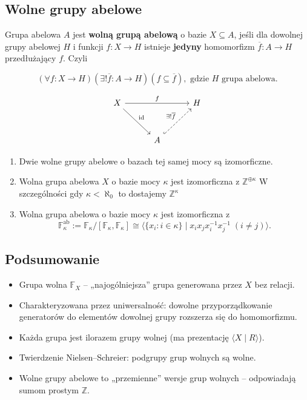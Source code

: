 \subsection*{Wolne grupy abelowe}

\begin{definition}
    Grupa abelowa $A$ jest \textbf{wolną grupą abelową} o bazie $X \subseteq A$, jeśli dla dowolnej grupy abelowej $H$ i funkcji $f: X \to H$ istnieje \textbf{jedyny} homomorfizm $\overline{f}: A \to H$ przedłużający $f$. Czyli

    \[
	   	\left(\forall f : X \to H \right)\left(\exists ! \overline{f}: A \to H \right)\left( f \subseteq \overline{f} \right), \text{ gdzie } H \text{ grupa abelowa} .\]

	\[
		\begin{tikzcd}[row sep=30pt, column sep=30pt]
			X \arrow[dr, "\id"] \arrow[rr, "f"] & & H \\
			& A \arrow[ur, "\exists ! \overline{f}", dashed, hook] &
		\end{tikzcd}
	  \]
\end{definition}

\begin{remark}[Własności]
    \begin{enumerate}[label=\arabic*)]
						\item Dwie wolne grupy abelowe o bazach tej samej mocy są izomorficzne.
		\item Wolna grupa abelowa $X$ o bazie mocy $\kappa$ jest izomorficzna z $\mathbb{Z}^{\oplus\kappa}$
			 W szczególności gdy $\kappa < \aleph_0$ to dostajemy $\mathbb{Z}^{\kappa}$ 

        \item Wolna grupa abelowa o bazie mocy $\kappa$ jest izomorficzna z
        \[
        \mathbb{F}_{\kappa}^{\mathrm{ab}} := \mathbb{F}_\kappa / [\mathbb{F}_\kappa, \mathbb{F}_\kappa] \cong \langle \{x_i : i \in \kappa\} \mid x_i x_j x_i^{-1} x_j^{-1} \;(i \neq j) \rangle.
        \]
    \end{enumerate}
\end{remark}
\subsection*{Podsumowanie}

\begin{itemize}
    \item Grupa wolna $\mathbb{F}_X$ – „najogólniejsza” grupa generowana przez $X$ bez relacji.
    \item Charakteryzowana przez uniwersalność: dowolne przyporządkowanie generatorów do elementów dowolnej grupy rozszerza się do homomorfizmu.
    \item Każda grupa jest ilorazem grupy wolnej (ma prezentację $\langle X \mid R \rangle$).
    \item Twierdzenie Nielsen–Schreier: podgrupy grup wolnych są wolne.
    \item Wolne grupy abelowe to „przemienne” wersje grup wolnych – odpowiadają sumom prostym $\mathbb{Z}$.
\end{itemize}

